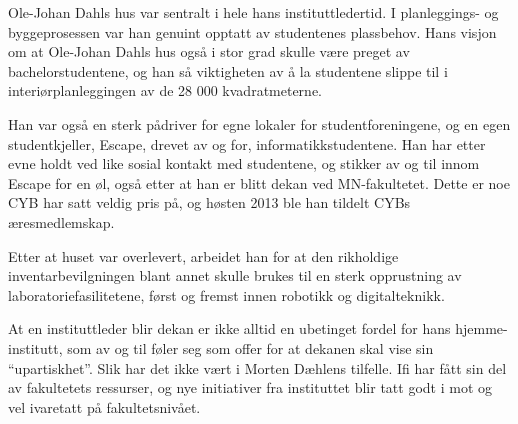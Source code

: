 Ole-Johan Dahls hus var sentralt i hele hans instituttledertid. I planleggings- og byggeprosessen var han genuint opptatt av studentenes plassbehov. Hans visjon om at Ole-Johan Dahls hus også i stor grad skulle være preget av bachelorstudentene, og han så viktigheten av å la studentene slippe til i interiørplanleggingen av de 28 000 kvadratmeterne. 

Han var også en sterk pådriver for egne lokaler for studentforeningene, og en egen studentkjeller, Escape, drevet av og for, informatikkstudentene. Han har etter evne holdt ved like sosial kontakt med studentene, og stikker av og til innom Escape for en øl, også etter at han er blitt dekan ved MN-fakultetet. Dette er noe CYB har satt veldig pris på, og høsten 2013 ble han tildelt CYBs æresmedlemskap.

Etter at huset var overlevert, arbeidet han for at den rikholdige inventarbevilgningen blant annet skulle brukes til en sterk opprustning av laboratoriefasilitetene, først og fremst innen robotikk og digitalteknikk.

At en instituttleder blir dekan er ikke alltid en ubetinget fordel for hans hjemme-institutt, som av og til føler seg som offer for at dekanen skal vise sin ``upartiskhet''. Slik har det ikke vært i Morten Dæhlens tilfelle. Ifi har fått sin del av fakultetets ressurser, og nye initiativer fra instituttet blir tatt
godt i mot og vel ivaretatt på fakultetsnivået.
